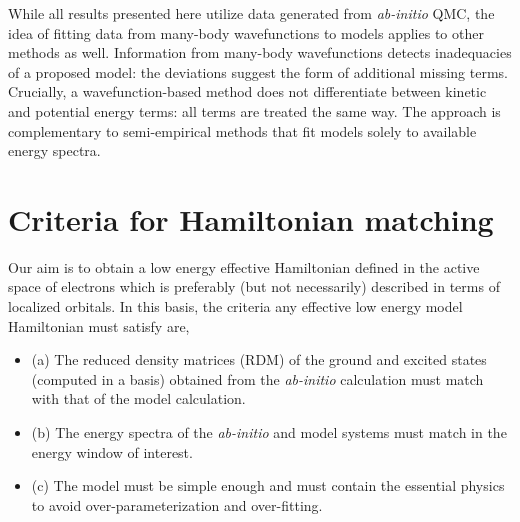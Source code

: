 \documentclass[prl,12pt,onecolumn,nofootinbib,notitlepage,english,superscriptaddress]{revtex4-1}
\newcommand{\HJC}[1]{{\color{RED}{\bf HJC: #1}}}
\begin{document}
While all results presented here utilize data generated from 
\emph{ab-initio} QMC, the idea of fitting data from many-body wavefunctions to models applies 
to other methods as well. Information from many-body wavefunctions detects 
inadequacies of a proposed model: the deviations suggest the form of additional missing terms. 
Crucially, a wavefunction-based method does not differentiate between kinetic 
and potential energy terms: all terms are treated the same way. 
The approach is complementary to semi-empirical methods that 
fit models solely to available energy spectra. 

\section{Criteria for Hamiltonian matching}

\HJC{What principles are important for connecting a problem of many electrons to a problem of few electrons}
\HJC{Focus on density matrices and emphasize the reduction in number of effective orbitals. A dual problem: get the optimal one body space and also get the optimal effective interactions.}
\HJC{Include Lucas' perspective}
Our aim is to obtain a low energy effective Hamiltonian defined in 
the active space of electrons which is preferably (but not necessarily) 
described in terms of localized orbitals. In this basis, the criteria any 
effective low energy model Hamiltonian must satisfy are,
\begin{itemize}
\item (a) The reduced density matrices (RDM) of the ground and excited states (computed in a basis) 
          obtained from the \emph{ab-initio} calculation must match with that of the model calculation. 

\item (b) The energy spectra of the \emph{ab-initio} and model systems must match in the energy window of interest. 

\item(c) The model must be simple enough and must contain the essential physics to avoid over-parameterization and over-fitting. 
\end{itemize}
\end{document}
